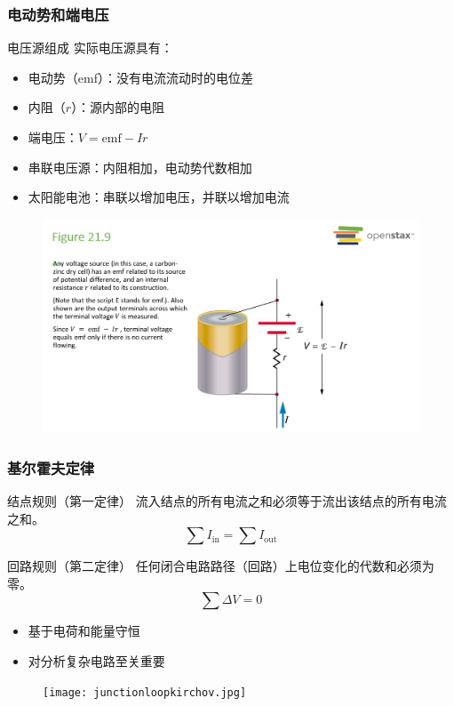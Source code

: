 \documentclass{beamer}
\begin{document}
\begin{frame}
    \frametitle{电动势和端电压}
    \begin{block}{电压源组成}
        实际电压源具有：
        \begin{itemize}
            \item 电动势（emf）：没有电流流动时的电位差
            \item 内阻（$r$）：源内部的电阻
        \end{itemize}
    \end{block}
    \begin{itemize}
        \item 端电压：$V = \text{emf} - Ir$
        \item 串联电压源：内阻相加，电动势代数相加
        \item 太阳能电池：串联以增加电压，并联以增加电流
    \end{itemize}
\end{frame}
\begin{frame}
    \begin{figure}
        \centering
        \includegraphics[width=1\linewidth]{phys12-circuits-internal-resistance.png}
    \end{figure}
\end{frame}
\begin{frame}
    \frametitle{基尔霍夫定律}
    \begin{block}{结点规则（第一定律）}
        流入结点的所有电流之和必须等于流出该结点的所有电流之和。
        \[ \sum I_{\text{in}} = \sum I_{\text{out}} \]
    \end{block}
    \begin{block}{回路规则（第二定律）}
        任何闭合电路路径（回路）上电位变化的代数和必须为零。
        \[ \sum \Delta V = 0 \]
    \end{block}
    \begin{itemize}
        \item 基于电荷和能量守恒
        \item 对分析复杂电路至关重要
    \end{itemize}
\end{frame}
\begin{frame}{}
    \begin{figure}
        \centering
        \texttt{[image: junctionloopkirchov.jpg]}
    \end{figure}
\end{frame}
\end{document}
